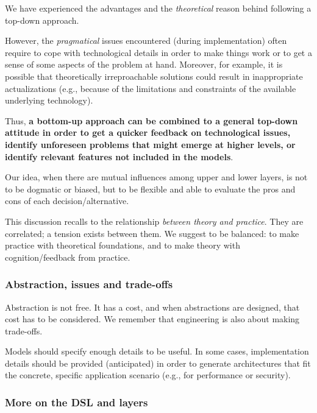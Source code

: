 \documentclass[11pt]{article}
\begin{document}
 We have experienced the advantages and the \emph{theoretical} reason behind
  following a top-down approach.
 
 However, the \emph{pragmatical} issues encountered (during implementation)
 often require to cope with technological details in order to make things work 
  or to get a sense of some aspects of the problem at hand. Moreover, for
  example, it is possible that theoretically irreproachable solutions 
  could result in inappropriate actualizations (e.g., because of the
  limitations and constraints of the available underlying technology). 

 Thus, \textbf{a bottom-up approach can be combined to a general top-down
 attitude in order to get a quicker feedback on technological issues, identify unforeseen 
  problems that might emerge at higher levels, or identify relevant features
  not included in the models}.
  
 Our idea, when there are mutual influences among upper and lower layers, is not
 to be dogmatic or biased, but to be flexible 
 and able to evaluate the pros and cons of each decision/alternative.

 This discussion recalls to the relationship \emph{between theory and practice}.
   They are correlated; a tension exists between them. 
   We suggest to be balanced: to make practice with theoretical foundations,
   and to make theory with cognition/feedback from practice.


\subsubsection{Abstraction, issues and trade-offs}

 Abstraction is not free. It has a cost, and when 
  abstractions are designed, that cost has to be considered.
 We remember that engineering is also about making trade-offs.
 
 Models should specify enough details to be useful. In some cases,
  implementation details should be provided (anticipated) in order to generate
  architectures that fit the concrete, specific application scenario (e.g., for
  performance or security).


\subsubsection{More on the DSL and layers}  
  
\end{document}
